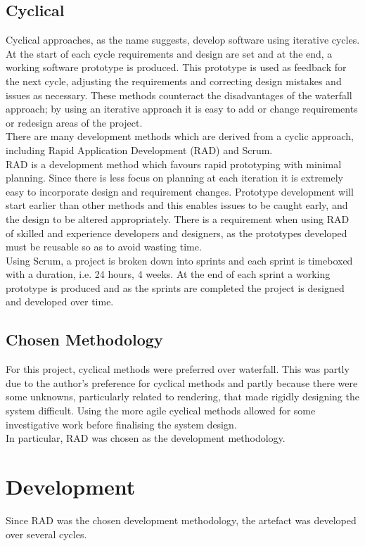 \subsection{Cyclical}
Cyclical approaches, as the name suggests, develop software using iterative cycles. At the start of each cycle requirements and design are set and at the end, a working software prototype is produced. This prototype is used as feedback for the next cycle, adjusting the requirements and correcting design mistakes and issues as necessary. These methods counteract the disadvantages of the waterfall approach; by using an iterative approach it is easy to add or change requirements or redesign areas of the project.
\\There are many development methods which are derived from a cyclic approach, including Rapid Application Development (RAD) and Scrum.
\\RAD is a development method which favours rapid prototyping with minimal planning. Since there is less focus on planning at each iteration it is extremely easy to incorporate design and requirement changes. Prototype development will start earlier than other methods and this enables issues to be caught early, and the design to be altered appropriately. There is a requirement when using RAD of skilled and experience developers and designers, as the prototypes  developed must be reusable so as to avoid wasting time.
\\Using Scrum, a project is broken down into sprints and each sprint is timeboxed with a duration, i.e. 24 hours, 4 weeks. At the end of each sprint a working prototype is produced and as the sprints are completed the project is designed and developed over time.

\subsection{Chosen Methodology}
For this project, cyclical methods were preferred over waterfall. This was partly due to the author's preference for cyclical methods and partly because there were some unknowns, particularly related to rendering, that made rigidly designing the system difficult. Using the more agile cyclical methods allowed for some investigative work before finalising the system design.
\\In particular, RAD was chosen as the development methodology.

\section{Development}
Since RAD was the chosen development methodology, the artefact was developed over several cycles.

